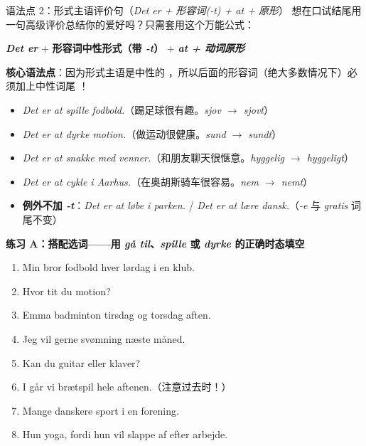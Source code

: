 \begin{grammatikbox}{语法点 2：形式主语评价句（\textit{Det er + 形容词(-t) + at + 原形}）}
想在口试结尾用一句高级评价总结你的爱好吗？只需套用这个万能公式：
\begin{center}
\textbf{\color{NCDNavy}\textit{Det er}} + \textbf{\color{NCDRed}形容词中性形式（带 \textit{-t}）} + \textbf{\color{NCDTeal}\textit{at + 动词原形}}
\end{center}
\textbf{核心语法点}：因为形式主语是中性的 ，所以后面的形容词（绝大多数情况下）必须加上中性词尾 ！
\begin{itemize}
  \item \textit{Det er  at spille fodbold.}（踢足球很有趣。\textit{sjov $\rightarrow$ sjovt}）
  \item \textit{Det er  at dyrke motion.}（做运动很健康。\textit{sund $\rightarrow$ sundt}）
  \item \textit{Det er  at snakke med venner.}（和朋友聊天很惬意。\textit{hyggelig $\rightarrow$ hyggeligt}）
  \item \textit{Det er  at cykle i Aarhus.}（在奥胡斯骑车很容易。\textit{nem $\rightarrow$ nemt}）
  \item \textbf{例外不加 \textit{-t}}：\textit{Det er  at løbe i parken.} / \textit{Det er  at lære dansk.}（\textit{-e} 与 \textit{gratis} 词尾不变）
\end{itemize}
\end{grammatikbox}


\textbf{练习 A：搭配选词——用 \textit{gå til}、\textit{spille} 或 \textit{dyrke} 的正确时态填空}
\begin{enumerate}
  \item Min bror \underline{\hspace{2.2cm}} fodbold hver lørdag i en klub.
  \item Hvor tit \underline{\hspace{2.2cm}} du motion?
  \item Emma \underline{\hspace{2.2cm}} badminton tirsdag og torsdag aften.
  \item Jeg vil gerne \underline{\hspace{2.2cm}} svømning næste måned.
  \item Kan du \underline{\hspace{2.2cm}} guitar eller klaver?
  \item I går \underline{\hspace{2.2cm}} vi brætspil hele aftenen.（注意过去时！）
  \item Mange danskere \underline{\hspace{2.2cm}} sport i en forening.
  \item Hun \underline{\hspace{2.2cm}} yoga, fordi hun vil slappe af efter arbejde.
\end{enumerate}

